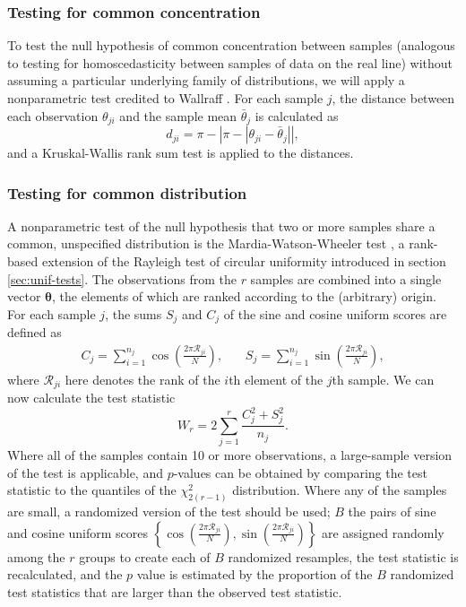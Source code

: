 \documentclass[../../ArchStats.tex]{subfiles}
\begin{document}
\subsubsection{Testing for common concentration}
\label{sec:common-concentration}

To test the null hypothesis of common concentration between samples (analogous to testing for homoscedasticity between samples of data on the real line) without assuming a particular underlying family of distributions, we will apply a nonparametric test credited to Wallraff \cite{Wallraff1979}. For each sample $j$, the distance between each observation $\theta_{ji}$ and the sample mean $\bar{\theta}_j$ is calculated as
	\begin{equation}
	d_{ji} = \pi - \left\vert \pi - \left\vert \theta_{ji} - 	\bar{\theta}_j \right\vert \right\vert,
	\end{equation}
and a Kruskal-Wallis rank sum test is applied to the distances.

\subsubsection{Testing for common distribution}

A nonparametric test of the null hypothesis that two or more samples share a common, unspecified distribution is the Mardia-Watson-Wheeler test \cite{Wheeler1962, Mardia1972}, a rank-based extension of the Rayleigh test of circular uniformity introduced in section \ref{sec:unif-tests}. The observations from the $r$ samples are combined into a single vector $\boldsymbol{\theta}$, the elements of which are ranked according to the (arbitrary) origin. For each sample $j$, the sums $S_j$ and $C_j$ of the sine and cosine uniform scores are defined as
	\begin{equation}
	\begin{matrix*}
	C_j = \sum_{i=1}^{n_j} \cos \left( \frac{2\pi \mathcal{R}_{ji}}{N} \right),  & \,  &
	S_j = \sum_{i=1}^{n_j} \sin \left( \frac{2\pi \mathcal{R}_{ji}}{N} \right),
	\end{matrix*} 
	\end{equation}
where $\mathcal{R}_{ji}$ here denotes the rank of the $i$th element of the $j$th sample. We can now calculate the test statistic
	\begin{equation}
	W_r = 2 \sum_{j=1}^r \frac{C_j^2 + S_j^2}{n_j}.
 	\end{equation}
Where all of the samples contain 10 or more observations, a large-sample version of the test is applicable, and $p$-values can be obtained by comparing the test statistic to the quantiles of the $\chi^2_{2(r-1)}$ distribution. Where any of the samples are small, a randomized version of the test should be used; $B$ the pairs of sine and cosine uniform scores $\left\lbrace \cos \left( \frac{2\pi \mathcal{R}_{ji}}{N}\right), \sin \left( \frac{2\pi \mathcal{R}_{ji}}{N}\right) \right\rbrace$ are assigned randomly among the $r$ groups to create each of $B$ randomized resamples, the test statistic is recalculated, and the $p$ value is estimated by the proportion of the $B$ randomized test statistics that are larger than the observed test statistic.
\end{document}
